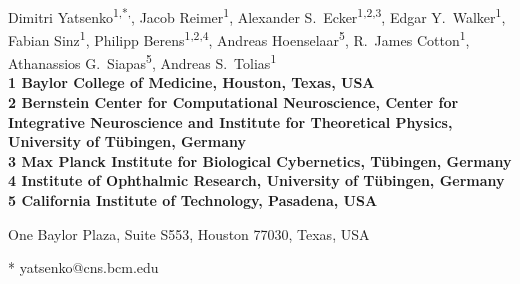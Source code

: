 \documentclass[10pt,letterpaper]{article}
\date{}
\begin{document}
\vspace*{0.35in}

\begin{flushleft}
{\Large
\textbf{}
}
\newline
\\
Dimitri Yatsenko\textsuperscript{1,*,\ddag}, 
Jacob Reimer\textsuperscript{1}, 
Alexander S.~Ecker\textsuperscript{1,2,3}, 
Edgar Y.~Walker\textsuperscript{1},
Fabian Sinz\textsuperscript{1}, 
Philipp Berens\textsuperscript{1,2,4}, 
Andreas Hoenselaar\textsuperscript{5}, 
R.~James Cotton\textsuperscript{1}, 
Athanassios G.~Siapas\textsuperscript{5}, 
Andreas S.~Tolias\textsuperscript{1}
\\
\bigskip
\bf{1} Baylor College of Medicine, Houston, Texas, USA
\\
\bf{2} Bernstein Center for Computational Neuroscience, Center for Integrative Neuroscience and Institute for Theoretical Physics, University of Tübingen, Germany
\\
\bf{3} Max Planck Institute for Biological Cybernetics, Tübingen, Germany
\\
\bf{4} Institute of Ophthalmic Research, University of Tübingen, Germany
\\
\bf{5} California Institute of Technology, Pasadena, USA
\\
\bigskip

% 
%


\ddag One Baylor Plaza, Suite S553, Houston 77030, Texas, USA



* yatsenko@cns.bcm.edu

\end{flushleft}
\end{document}
